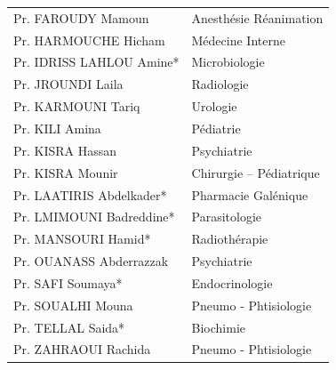       \begin{table}[H]

        \begin{tabular}{l l}
      Pr. FAROUDY Mamoun & \hspace*{2em} Anesthésie Réanimation \\
      Pr. HARMOUCHE Hicham	& \hspace*{2em} Médecine Interne\\
      Pr. IDRISS LAHLOU Amine* & \hspace*{2em} Microbiologie\\
      Pr. JROUNDI Laila & \hspace*{2em} Radiologie \\
      Pr. KARMOUNI Tariq	  & \hspace*{2em} Urologie \\
      Pr. KILI Amina & \hspace*{2em} Pédiatrie \\
      Pr. KISRA Hassan & \hspace*{2em} Psychiatrie \\
      Pr. KISRA Mounir & \hspace*{2em} Chirurgie – Pédiatrique \\
      Pr. LAATIRIS Abdelkader*	& \hspace*{2em} Pharmacie Galénique \\
      Pr. LMIMOUNI Badreddine* & \hspace*{2em} Parasitologie \\
      Pr. MANSOURI Hamid*	  & \hspace*{2em} Radiothérapie \\
      Pr. OUANASS Abderrazzak & \hspace*{2em} Psychiatrie \\
      Pr. SAFI Soumaya* & \hspace*{2em} Endocrinologie \\
      Pr. SOUALHI Mouna & \hspace*{2em} Pneumo - Phtisiologie \\
      Pr. TELLAL Saida* & \hspace*{2em} Biochimie \\
      Pr. ZAHRAOUI Rachida & \hspace*{2em} Pneumo - Phtisiologie \\

    \end{tabular}
      
  \end{table}

